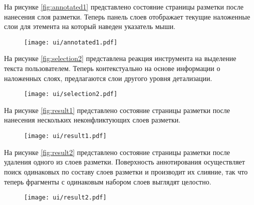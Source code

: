 \documentclass[../main]{subfiles}
\begin{document}
На рисунке \ref{fig:annotated1} представлено состояние страницы разметки после нанесения слоя разметки. Теперь панель слоев отображает текущие наложенные слои для этемента на который наведен указатель мыши.
\begin{figure}[H]
    \centering
    {\texttt{[image: ui/annotated1.pdf]}}
    \vspace{-\baselineskip}
\end{figure}

На рисунке \ref{fig:selection2} представлена реакция инструмента на выделение текста пользователем. Теперь контекстуально на основе информации о наложенных слоях, предлагаются слои другого уровня детализации.
\begin{figure}[H]
    \centering
    {\texttt{[image: ui/selection2.pdf]}}
    \vspace{-\baselineskip}
\end{figure}

На рисунке \ref{fig:result1} представлено состояние страницы разметки после нанесения нескольких неконфликтующих слоев разметки.
\begin{figure}[H]
    \centering
    {\texttt{[image: ui/result1.pdf]}}
    \vspace{-\baselineskip}
\end{figure}

На рисунке \ref{fig:result2} представлено состояние страницы разметки после удаления одного из слоев разметки. Поверхность аннотирования осуществляет поиск одинаковых по составу слоев разметки и производит их слияние, так что теперь фрагменты с одинаковым набором слоев выглядят целостно.
\begin{figure}[H]
    \centering
    {\texttt{[image: ui/result2.pdf]}}
    \vspace{-\baselineskip}
\end{figure}
\end{document}
